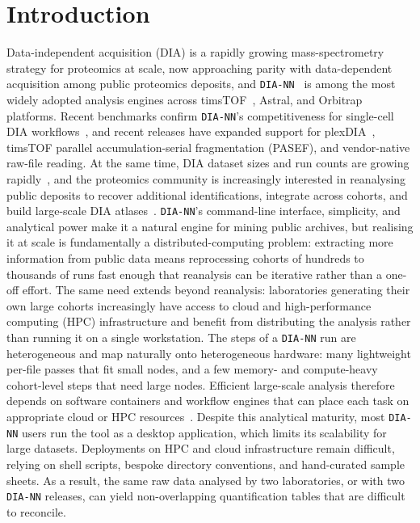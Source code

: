 \documentclass[preprint,12pt]{elsarticle}
\begin{document}
\section{Introduction}
\label{sec:introduction}
Data-independent acquisition (DIA) is a rapidly growing mass-spectrometry strategy for proteomics at scale, now approaching parity with data-dependent acquisition among public proteomics deposits, and \texttt{DIA-NN}~\cite{demichev2020} is among the most widely adopted analysis engines across timsTOF~\cite{brunner2022,meier2020}, Astral, and Orbitrap platforms. Recent benchmarks confirm \texttt{DIA-NN}'s competitiveness for single-cell DIA workflows~\cite{wang2025}, and recent releases have expanded support for plexDIA~\cite{derks2023, derks2023strategies}, timsTOF parallel accumulation-serial fragmentation (PASEF), and vendor-native raw-file reading. At the same time, DIA dataset sizes and run counts are growing rapidly~\cite{perezriverol2025pride}, and the proteomics community is increasingly interested in reanalysing public deposits to recover additional identifications, integrate across cohorts, and build large-scale DIA atlases~\cite{dai2024quantms,lautenbacher2022proteomicsdb}.
\texttt{DIA-NN}'s command-line interface, simplicity, and analytical power make it a natural engine for mining public archives, but realising it at scale is fundamentally a distributed-computing problem: extracting more information from public data means reprocessing cohorts of hundreds to thousands of runs fast enough that reanalysis can be iterative rather than a one-off effort. The same need extends beyond reanalysis: laboratories generating their own large cohorts increasingly have access to cloud and high-performance computing (HPC) infrastructure and benefit from distributing the analysis rather than running it on a single workstation. The steps of a \texttt{DIA-NN} run are heterogeneous and map naturally onto heterogeneous hardware: many lightweight per-file passes that fit small nodes, and a few memory- and compute-heavy cohort-level steps that need large nodes. Efficient large-scale analysis therefore depends on software containers and workflow engines that can place each task on appropriate cloud or HPC resources~\cite{perezriverol2020scalable}. Despite this analytical maturity, most \texttt{DIA-NN} users run the tool as a desktop application, which limits its scalability for large datasets. Deployments on HPC and cloud infrastructure remain difficult, relying on shell scripts, bespoke directory conventions, and hand-curated sample sheets. As a result, the same raw data analysed by two laboratories, or with two \texttt{DIA-NN} releases, can yield non-overlapping quantification tables that are difficult to reconcile.
\end{document}
